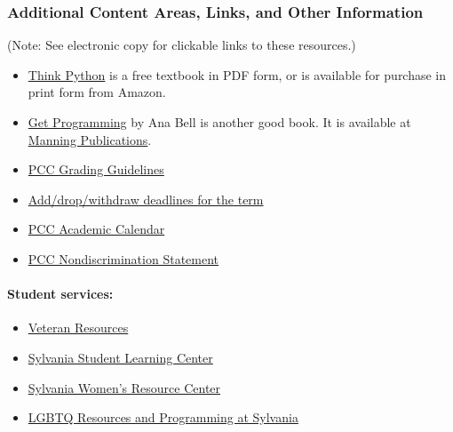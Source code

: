 \documentclass[11pt]{article}
\begin{document}
    \hypertarget{additional-content-areas-links-and-other-information}{%
\subsubsection{Additional Content Areas, Links, and Other
Information}\label{additional-content-areas-links-and-other-information}}

(Note: See electronic copy for clickable links to these resources.)

\begin{itemize}
\item
  \href{http://greenteapress.com/think-python}{Think Python} is a free
  textbook in PDF form, or is available for purchase in print form from
  Amazon.
\item
  \href{https://www.manning.com/books/get-programming}{Get Programming}
  by Ana Bell is another good book. It is available at
  \href{https://www.manning.com/}{Manning Publications}.
\item
  \href{http://www.pcc.edu/resources/academic/standards-practices/AcademicStandardsandPractices-GradingGuidelines.html}{PCC
  Grading Guidelines}
\item
  \href{http://www.pcc.edu/registration/dropping.html}{Add/drop/withdraw
  deadlines for the term}
\item
  \href{http://www.pcc.edu/registration/academic-calendar.html}{PCC
  Academic Calendar}
\item
  \href{https://www.pcc.edu/about/equity-inclusion/eeo-statement.html}{PCC
  Nondiscrimination Statement}
\end{itemize}

\hypertarget{student-services}{%
\paragraph{Student services:}\label{student-services}}

\begin{itemize}
\item
  \href{https://www.pcc.edu/resources/veterans/}{Veteran Resources}
\item
  \href{http://www.pcc.edu/resources/tutoring/sylvania/student-success/}{Sylvania
  Student Learning Center}
\item
  \href{https://www.pcc.edu/resources/women/sylvania/}{Sylvania Women's
  Resource Center}
\item
  \href{https://www.pcc.edu/resources/qrc/sylvania/}{LGBTQ Resources and
  Programming at Sylvania}
\end{itemize}
\end{document}
